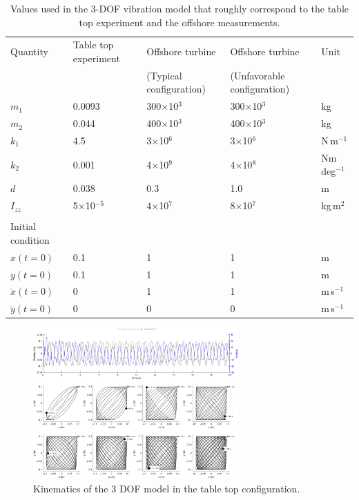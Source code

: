 \documentclass{article}
\begin{document}
\begin{table}[]
    \centering
    \begin{tabular}{l l l ll }
    \toprule
         Quantity & Table top experiment & Offshore turbine &  Offshore turbine & Unit \\
         & & (Typical configuration) & (Unfavorable configuration)\\
         \midrule
         $m_1$ & 0.0093 & 300$\times$10$^3$ & 300$\times$10$^3$ & kg\\ 
         $m_2$ & 0.044 & 400$\times$10$^3$ & 400$\times$10$^3$ & kg\\ 
         $k_1$ & 4.5 & 3$\times$10$^6$ & 3$\times$10$^6$ & N\,m$^{-1}$ \\ 
         $k_2$ & 0.001 & 4$\times$10$^9$ & 4$\times$10$^8$ & Nm\,deg$^{-1}$ \\ 
         $d$ & 0.038 & 0.3 & 1.0 & m\\ 
         $I_{zz}$ & 5$\times$10$^{-5}$ & 4$\times$10$^7$ & 8$\times$10$^7$ & kg\,m$^2$ \\
         \\
         Initial condition & \\
         \midrule
         $x(t=0)$ & 0.1 & 1 & 1 & m\\ 
         $y(t=0)$ & 0.1 & 1 & 1 & m\\
         $\dot{x}(t=0)$ & 0 & 1 & 1 & m\,s$^{-1}$ \\
         $\dot{y}(t=0)$ & 0 & 0 & 0 & m\,s$^{-1}$ \\
         \bottomrule
    \end{tabular}
    \caption{Values used in the 3-DOF vibration model that roughly correspond to the table top experiment and the offshore measurements.}
    \label{tab:3dof-variable-values}
\end{table}

\begin{figure}
    \centering
    \includegraphics[width=0.7\textwidth]{figures/tabletop.png}
    \caption{Kinematics of the 3 DOF model in the table top configuration.}
    \label{fig:3dof-tabletop}
\end{figure}
\end{document}
